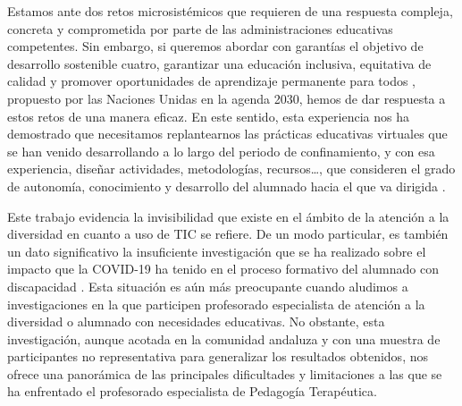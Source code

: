 \documentclass{textolivre}
\begin{document}
Estamos ante dos retos microsistémicos que requieren de una respuesta compleja, concreta y comprometida por parte de las administraciones educativas competentes. Sin embargo, si queremos abordar con garantías el objetivo de desarrollo sostenible cuatro, garantizar una educación inclusiva, equitativa de calidad y promover oportunidades de aprendizaje permanente para todos \cite[p. 16]{onu2015}, %
propuesto por las Naciones Unidas en la agenda 2030, hemos de dar respuesta a estos retos de una manera eficaz. En este sentido, esta experiencia nos ha demostrado que necesitamos replantearnos las prácticas educativas virtuales que se han venido desarrollando a lo largo del periodo de confinamiento, y con esa experiencia, diseñar actividades, metodologías, recursos…, que consideren el grado de autonomía, conocimiento y desarrollo del alumnado hacia el que va dirigida \cite{moreno2020}. %

Este trabajo evidencia la invisibilidad que existe en el ámbito de la atención a la diversidad en cuanto a uso de TIC se refiere. De un modo particular, es también un dato significativo la insuficiente investigación que se ha realizado sobre el impacto que la COVID-19 ha tenido en el proceso formativo del alumnado con discapacidad \cite[p. 7]{vega2020}. %
Esta situación es aún más preocupante cuando aludimos a investigaciones en la que participen profesorado especialista de atención a la diversidad o alumnado con necesidades educativas. No obstante, esta investigación, aunque acotada en la comunidad andaluza y con una muestra de participantes no representativa para generalizar los resultados obtenidos, nos ofrece una panorámica de las principales dificultades y limitaciones a las que se ha enfrentado el profesorado especialista de Pedagogía Terapéutica. 

\printbibliography\label{sec-bibliography}
\end{document}
